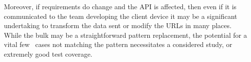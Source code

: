Moreover, if requirements do change and the API is affected, then even if it is communicated to the team developing the client device it may be a significant undertaking to transform the data sent or modify the URLs in many places. While the bulk may be a straightforward pattern replacement, the potential for a vital few~\cite{pareto_software_dev} cases not matching the pattern necessitates a considered study, or extremely good test coverage.

